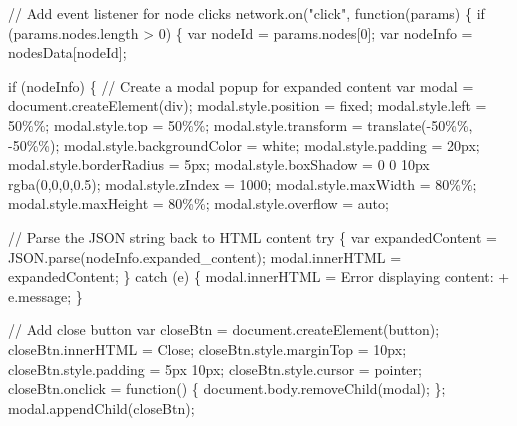 \documentclass[
  11pt,
  letterpaper,
]{book}
\newenvironment{Shaded}{\begin{snugshade}}{\end{snugshade}}
\newcommand{\SpecialCharTok}[1]{\textcolor[rgb]{0.37,0.37,0.37}{#1}}
\newcommand{\StringTok}[1]{\textcolor[rgb]{0.13,0.47,0.30}{#1}}
\begin{document}
\begin{landscape}
\begin{Shaded}
\begin{Highlighting}[]
\StringTok{    // Add event listener for node clicks}
\StringTok{    network.on("click", function(params) \{}
\StringTok{        if (params.nodes.length \textgreater{} 0) \{}
\StringTok{            var nodeId = params.nodes[0];}
\StringTok{            var nodeInfo = nodesData[nodeId];}

\StringTok{            if (nodeInfo) \{}
\StringTok{                // Create a modal popup for expanded content}
\StringTok{                var modal = document.createElement(\textquotesingle{}div\textquotesingle{});}
\StringTok{                modal.style.position = \textquotesingle{}fixed\textquotesingle{};}
\StringTok{                modal.style.left = \textquotesingle{}50}\SpecialCharTok{\%\%}\StringTok{\textquotesingle{};}
\StringTok{                modal.style.top = \textquotesingle{}50}\SpecialCharTok{\%\%}\StringTok{\textquotesingle{};}
\StringTok{                modal.style.transform = \textquotesingle{}translate({-}50}\SpecialCharTok{\%\%}\StringTok{, {-}50}\SpecialCharTok{\%\%}\StringTok{)\textquotesingle{};}
\StringTok{                modal.style.backgroundColor = \textquotesingle{}white\textquotesingle{};}
\StringTok{                modal.style.padding = \textquotesingle{}20px\textquotesingle{};}
\StringTok{                modal.style.borderRadius = \textquotesingle{}5px\textquotesingle{};}
\StringTok{                modal.style.boxShadow = \textquotesingle{}0 0 10px rgba(0,0,0,0.5)\textquotesingle{};}
\StringTok{                modal.style.zIndex = \textquotesingle{}1000\textquotesingle{};}
\StringTok{                modal.style.maxWidth = \textquotesingle{}80}\SpecialCharTok{\%\%}\StringTok{\textquotesingle{};}
\StringTok{                modal.style.maxHeight = \textquotesingle{}80}\SpecialCharTok{\%\%}\StringTok{\textquotesingle{};}
\StringTok{                modal.style.overflow = \textquotesingle{}auto\textquotesingle{};}

\StringTok{                // Parse the JSON string back to HTML content}
\StringTok{                try \{}
\StringTok{                    var expandedContent = JSON.parse(nodeInfo.expanded\_content);}
\StringTok{                    modal.innerHTML = expandedContent;}
\StringTok{                \} catch (e) \{}
\StringTok{                    modal.innerHTML = \textquotesingle{}Error displaying content: \textquotesingle{} + e.message;}
\StringTok{                \}}

\StringTok{                // Add close button}
\StringTok{                var closeBtn = document.createElement(\textquotesingle{}button\textquotesingle{});}
\StringTok{                closeBtn.innerHTML = \textquotesingle{}Close\textquotesingle{};}
\StringTok{                closeBtn.style.marginTop = \textquotesingle{}10px\textquotesingle{};}
\StringTok{                closeBtn.style.padding = \textquotesingle{}5px 10px\textquotesingle{};}
\StringTok{                closeBtn.style.cursor = \textquotesingle{}pointer\textquotesingle{};}
\StringTok{                closeBtn.onclick = function() \{}
\StringTok{                    document.body.removeChild(modal);}
\StringTok{                \};}
\StringTok{                modal.appendChild(closeBtn);}


\end{Highlighting}
\end{Shaded}
\end{landscape}
\end{document}
